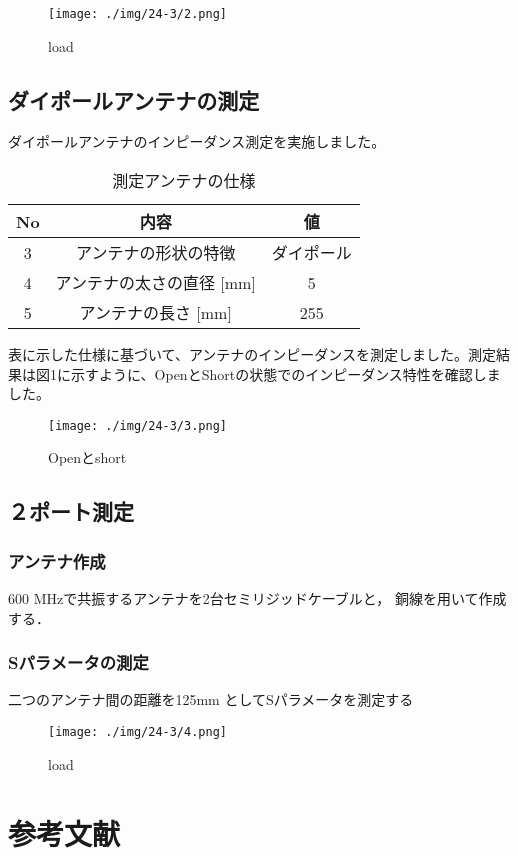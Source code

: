 \documentclass[a4paper,11pt,xelatex,ja=standard]{bxjsarticle}
\begin{document}
        \begin{figure}[H]
            \centering
            \texttt{[image: ./img/24-3/2.png]}
            \caption{load}
        \end{figure}

    \subsection{ダイポールアンテナの測定}
        ダイポールアンテナのインピーダンス測定を実施しました。
        
        \begin{table}[H]
            \centering
            \begin{tabular}{|c|c|c|}
                \hline
                No & 内容 & 値 \\
                \hline
                3 & アンテナの形状の特徴 &  ダイポール\\
                \hline
                4 & アンテナの太さの直径 [mm] &  5\\
                \hline
                5 & アンテナの長さ [mm] &  255\\
                \hline
            \end{tabular}
            \caption{測定アンテナの仕様}
        \end{table}

        表に示した仕様に基づいて、アンテナのインピーダンスを測定しました。測定結果は図1に示すように、OpenとShortの状態でのインピーダンス特性を確認しました。

        \begin{figure}[H]
            \centering
            \texttt{[image: ./img/24-3/3.png]}
            \caption{Openとshort}
        \end{figure}

    \subsection{２ポート測定}
        \subsubsection{アンテナ作成}
            600 MHzで共振するアンテナを2台セミリジッドケーブルと， 銅線を用いて作成する．
        \subsubsection{Sパラメータの測定}
            二つのアンテナ間の距離を125mm としてSパラメータを測定する
            \begin{figure}[H]
                \centering
                \texttt{[image: ./img/24-3/4.png]}
                \caption{load}
            \end{figure}


\section{参考文献}
\end{document}
